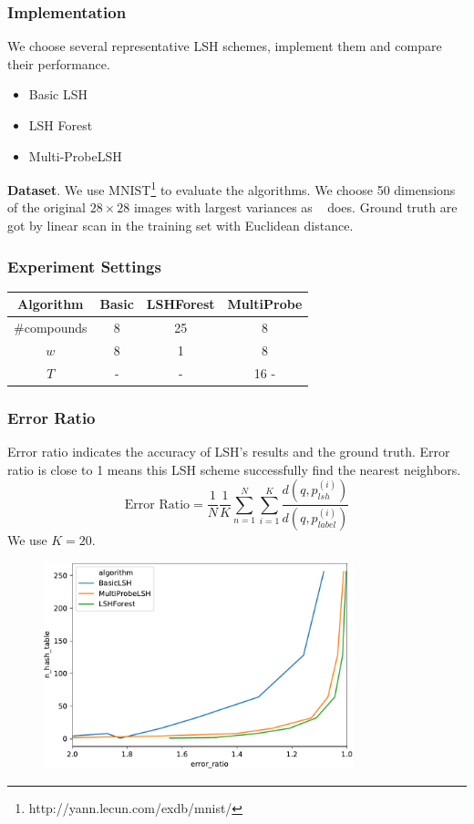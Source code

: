 \begin{frame}
\frametitle{Implementation}
We choose several representative LSH schemes, implement them and compare their performance.
\begin{itemize}
	\item Basic LSH
	\item LSH Forest
	\item Multi-ProbeLSH
\end{itemize}

\textbf{Dataset}. We use MNIST\footnote{http://yann.lecun.com/exdb/mnist/} to evaluate the algorithms. We choose 50 dimensions of the original $28\times28$ images with largest variances as ~\cite{gan2012locality} does. Ground truth are got by linear scan in the training set with Euclidean distance.
\end{frame}

\begin{frame}
	\frametitle{Experiment Settings}
	\begin{table}
		\begin{tabular}{cccc}
			\hline
			Algorithm & Basic & LSHForest & MultiProbe  \\ \hline
			\#compounds & 8 & 25 & 8 \\\hline
			$w$ & 8 & 1 & 8 \\\hline
			$T$ & - & - & 16 - \\ \hline
		\end{tabular}
	\end{table}
\end{frame}

\begin{frame}[allowframebreaks]
\frametitle{Error Ratio}
Error ratio indicates the accuracy of LSH's results and the ground truth.
Error ratio is close to 1 means this LSH scheme successfully find the nearest neighbors.
	\begin{equation}
		\text{Error Ratio}=\frac{1}{N}\frac{1}{K}\sum_{n=1}^{N}\sum_{i=1}^{K}\frac{d(q, p_{lsh}^{(i)})}{d(q, p_{label}^{(i)})}
	\end{equation}
We use $K=20$.

\pagebreak
\begin{figure}
\includegraphics[width=0.8\textwidth]{figures/error_ratio}
\end{figure}
\end{frame}

